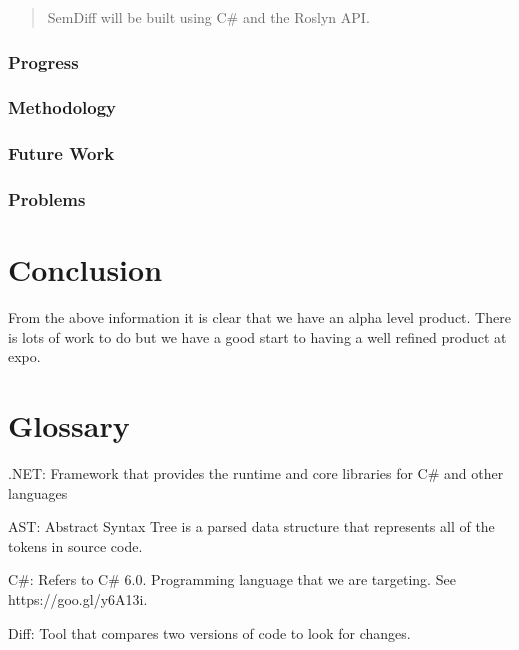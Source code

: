 \documentclass[draftclsnofoot,onecolumn]{IEEEtran}
\begin{document}
\begin{quote}

SemDiff will be built using C\# and the Roslyn API.

\end{quote}

\subsubsection{Progress}

\subsubsection{Methodology}

\subsubsection{Future Work}

\subsubsection{Problems}










\section{Conclusion}

From the above information it is clear that we have an alpha level product. There is lots of work to do but we have a good start to having a well refined product at expo.










\section{Glossary}

.NET: Framework that provides the runtime and core libraries for C\# and other languages

AST: Abstract Syntax Tree is a parsed data structure that represents all of the tokens in source code.

C\#: Refers to C\# 6.0. Programming language that we are targeting. See https://goo.gl/y6A13i.

Diff: Tool that compares two versions of code to look for changes.
\end{document}
